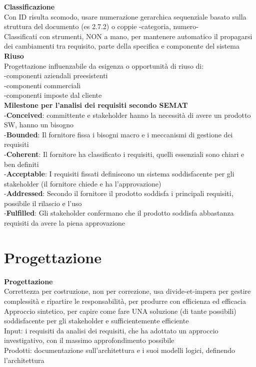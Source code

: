 \documentclass{article}
\begin{document}
		\textbf{Classificazione}\\
		Con ID risulta scomodo, usare numerazione gerarchica sequenziale basato sulla struttura del documento (es 2.7.2) o coppie -categoria, numero-\\
		Classificati con strumenti, NON a mano, per mantenere automatico il propagarsi dei cambiamenti tra requisito, parte della specifica e componente del sistema\\
		
		\textbf{Riuso}\\
		Progettazione influenzabile da esigenza o opportunità di riuso di:\\
		-componenti aziendali preesistenti\\
		-componenti commerciali\\
		-componenti imposte dal cliente\\
		
		\textbf{Milestone per l'analisi dei requisiti secondo SEMAT} \\
		-\textbf{Conceived}: committente e stakeholder hanno la necessità di avere un prodotto SW, hanno un bisogno\\
		-\textbf{Bounded}: Il fornitore fissa i bisogni macro e i meccanismi di gestione dei requisiti\\
		-\textbf{Coherent}: Il fornitore ha classificato i requisiti, quelli essenziali sono chiari e ben definiti\\
		-\textbf{Acceptable}: I requisiti fissati definiscono un sistema soddisfacente per gli stakeholder (il fornitore chiede e ha l'approvazione)\\
		-\textbf{Addressed}: Secondo il fornitore il prodotto soddisfa i principali requisiti, possibile il rilascio e l'uso\\
		-\textbf{Fulfilled}: Gli stakeholder confermano che il prodotto soddisfa abbastanza requisiti da avere la piena approvazione\\
		
		
		
	\clearpage
	\section{Progettazione}
		\textbf{Progettazione}\\
		Correttezza per costruzione, non per correzione, usa divide-et-impera per gestire complessità e ripartire le responsabilità, per produrre con efficienza ed efficacia\\
		Approccio sintetico, per capire come fare UNA soluzione (di tante possibili) soddisfacente per gli stakeholder e sufficientemente efficiente\\
		Input: i requisiti da analisi dei requisiti, che ha adottato un approccio investigativo, con il massimo approfondimento possibile\\
		Prodotti: documentazione sull'architettura e i suoi modelli logici, definendo l'architettura\\
		
\end{document}
